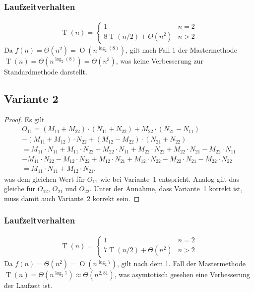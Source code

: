 \documentclass[a4paper]{article}
\newcommand{\BigO}{\operatorname{O}}
\newcommand{\T}{\operatorname{T}}
\begin{document}
    \subsubsection*{Laufzeitverhalten}
    \begin{align*}
        \T(n) =
        \begin{cases}
            1 & n = 2 \\
            8\T(n / 2) + \Theta(n^2) & n > 2
        \end{cases}
    \end{align*}
    Da $f(n) = \Theta(n^2) = \BigO(n^{\log_2(8)})$, gilt nach Fall 1 der Mastermethode $\T(n) = \Theta(n^{\log_2(8)}) = \Theta(n^3)$, was keine Verbesserung zur {\glqq}Standardmethode{\grqq} darstellt.

    \subsection*{Variante 2}
    \label{subsec:variante2}
    \begin{proof}
        Es gilt
        \begin{multline*}
            O_{11} = (M_{11}+M_{22})\cdot(N_{11}+N_{22}) + M_{22}\cdot(N_{21}-N_{11}) \\
            - (M_{11} + M_{12}) \cdot N_{22} + (M_{12}-M_{22})\cdot(N_{21}+N_{22}) \\
            = M_{11}\cdot N_{11} + M_{11}\cdot N_{22} + M_{22}\cdot N_{11} + M_{22}\cdot N_{22} + M_{22}\cdot N_{21} - M_{22}\cdot N_{11} \\
            - M_{11}\cdot N_{22} - M_{12}\cdot N_{22} + M_{12}\cdot N_{21} + M_{12}\cdot N_{22} - M_{22}\cdot N_{21} - M_{22}\cdot N_{22} \\
            = M_{11} \cdot N_{11} + M_{12} \cdot N_{21}
            \text{,}
        \end{multline*}
        was dem gleichen Wert für $O_{11}$ wie bei Variante~1 entspricht. Analog gilt das gleiche für $O_{12}$, $O_{21}$ und $O_{22}$.
        Unter der Annahme, dass Variante~1 korrekt ist, muss damit auch Variante~2 korrekt sein.
    \end{proof}

    \subsubsection*{Laufzeitverhalten}
    \begin{align*}
        \T(n) =
        \begin{cases}
            1 & n = 2 \\
            7\T(n / 2) + \Theta(n^2) & n > 2
        \end{cases}
    \end{align*}
    Da $f(n) = \Theta(n^2) = \BigO(n^{\log_{2}{7}})$, gilt nach dem 1. Fall der Mastermethode $\T(n) = \Theta(n^{\log_2{7}}) \approx \Theta(n^{2{,}81})$, was asymtotisch gesehen eine Verbesserung der Laufzeit ist.
\end{document}
